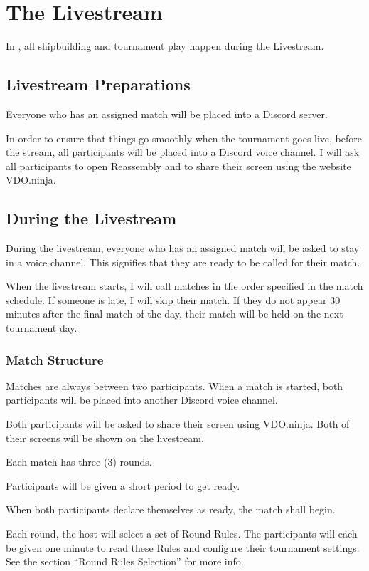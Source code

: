 \documentclass[11pt,letterpaper]{article}
\begin{document}
\section{The Livestream}
In \RTL{}, all shipbuilding and tournament play happen during the Livestream.

\subsection{Livestream Preparations}
Everyone who has an assigned match will be placed into a Discord server. 

In order to ensure that things go smoothly when the tournament goes live, before the stream, 
all participants will be placed into a Discord voice channel. I will ask all participants to open 
Reassembly and to share their screen using the website VDO.ninja.

\subsection{During the Livestream}
During the livestream, everyone who has an assigned match will be asked to stay in a voice
channel. This signifies that they are ready to be called for their match. 

When the livestream starts, I will call matches in the order specified in the match schedule.
If someone is late, I will skip their match. If they do not appear
30 minutes after the final match of the day, their match will be held on the next tournament day.

\subsubsection{Match Structure}
Matches are always between two participants.
When a match is started, both participants will be placed into another Discord voice channel.

Both participants will be asked to share their screen using VDO.ninja. Both of their screens will be
shown on the livestream.

Each match has three (3) rounds.

Participants will be given a short period to get ready. 

When both participants declare themselves as ready, the match shall begin.


Each round, the host will select a set of Round Rules. The participants will each be given one minute to read these Rules and configure their tournament settings.
See the section ``Round Rules Selection'' for more info.
\end{document}
